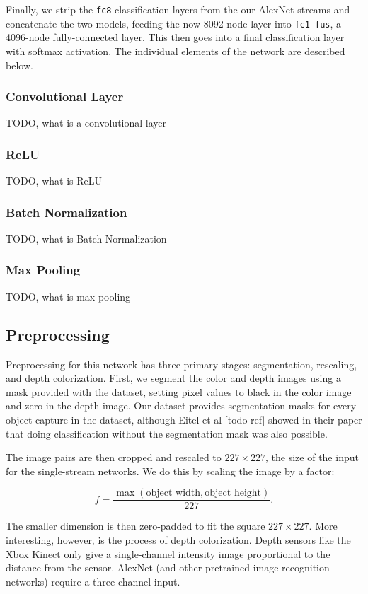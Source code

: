 Finally, we strip the \texttt{fc8} classification layers from the our AlexNet
streams and concatenate the two models, feeding the now 8092-node layer into
\texttt{fc1-fus}, a 4096-node fully-connected layer. This then goes into a final classification layer with softmax activation. The individual elements of the network are described below.

\subsubsection{Convolutional Layer}
TODO, what is a convolutional layer

\subsubsection{ReLU}
TODO, what is ReLU

\subsubsection{Batch Normalization}
TODO, what is Batch Normalization

\subsubsection{Max Pooling}
TODO, what is max pooling




\subsection{Preprocessing}

Preprocessing for this network has three primary stages: segmentation, rescaling, and depth colorization. First, we segment the color and depth images using a mask provided with the dataset, setting pixel values to black in the color image and zero in the depth image. Our dataset provides segmentation masks for every object capture in the dataset, although Eitel et al [todo ref] showed in their paper that doing classification without the segmentation mask was also possible.

The image pairs are then cropped and rescaled to $227 \times 227$, the size of the input for the single-stream networks. We do this by scaling the image by a factor:

\[ f = \frac{\max(\text{object width}, \text{object height})}{227}. \]

The smaller dimension is then zero-padded to fit the square $227 \times 227$. More interesting, however, is the process of depth colorization. Depth sensors like the Xbox Kinect only give a single-channel intensity image proportional to the distance from the sensor. AlexNet (and other pretrained image recognition networks) require a three-channel input.

